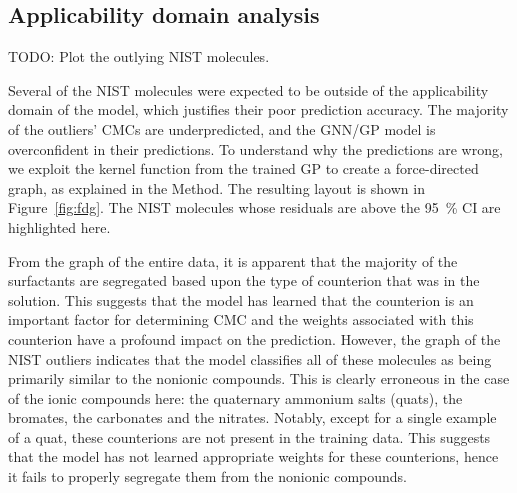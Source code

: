 \subsection{Applicability domain analysis}

TODO: Plot the outlying NIST molecules.

Several of the NIST molecules were expected to be outside of the applicability
domain of the model, which justifies their poor prediction accuracy. The
majority of the outliers' CMCs are underpredicted, and the GNN/GP model is
overconfident in their predictions. To understand why the predictions are wrong,
we exploit the kernel function from the trained GP to create a force-directed
graph, as explained in the Method. The resulting layout is shown in
Figure~\ref{fig:fdg}. The NIST molecules whose residuals are above the \SI{95}{\%}
CI are highlighted here.

From the graph of the entire data, it is apparent that the majority of the
surfactants are segregated based upon the type of counterion that was in the
solution. This suggests that the model has learned that the counterion is an
important factor for determining CMC and the weights associated with this
counterion have a profound impact on the prediction. However, the graph of the
NIST outliers indicates that the model classifies all of these molecules as
being primarily similar to the nonionic compounds. This is clearly erroneous in
the case of the ionic compounds here: the quaternary ammonium salts (quats), the
bromates, the carbonates and the nitrates. Notably, except for a single example
of a quat, these counterions are not present in the training data. This suggests
that the model has not learned appropriate weights for these counterions, hence
it fails to properly segregate them from the nonionic compounds.

